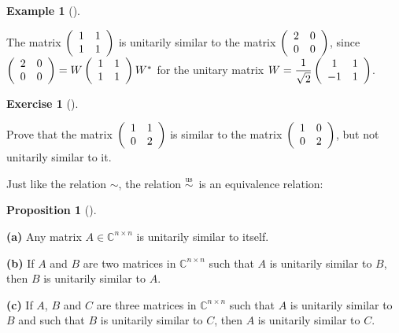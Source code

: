 \documentclass[numbers=enddot,12pt,final,onecolumn,notitlepage]{scrartcl}%
\newcounter{exer}
\numberwithin{exer}{subsection}
\theoremstyle{definition}
\newtheorem{prop}[theo]{Proposition}
\newenvironment{proposition}[1][]
{\begin{prop}[#1]\begin{leftbar}}
{\end{leftbar}\end{prop}}
\newtheorem{exam}[theo]{Example}
\newenvironment{example}[1][]
{\begin{exam}[#1]\begin{leftbar}}
{\end{leftbar}\end{exam}}
\newtheorem{exmp}[exer]{Exercise}
\newenvironment{exercise}[1][]
{\begin{exmp}[#1]\begin{leftbar}}
{\end{leftbar}\end{exmp}}
\begin{document}
\begin{example}
The matrix $\left(
\begin{array}
[c]{cc}%
1 & 1\\
1 & 1
\end{array}
\right)  $ is unitarily similar to the matrix $\left(
\begin{array}
[c]{cc}%
2 & 0\\
0 & 0
\end{array}
\right)  $, since $\left(
\begin{array}
[c]{cc}%
2 & 0\\
0 & 0
\end{array}
\right)  =W\left(
\begin{array}
[c]{cc}%
1 & 1\\
1 & 1
\end{array}
\right)  W^{\ast}$ for the unitary matrix $W=\dfrac{1}{\sqrt{2}}\left(
\begin{array}
[c]{cc}%
1 & 1\\
-1 & 1
\end{array}
\right)  $.
\end{example}

\begin{exercise}
\label{exe.schurtri.unisim.two2x2} Prove that the matrix $\left(
\begin{array}
[c]{cc}%
1 & 1\\
0 & 2
\end{array}
\right)  $ is similar to the matrix $\left(
\begin{array}
[c]{cc}%
1 & 0\\
0 & 2
\end{array}
\right)  $, but not unitarily similar to it.
\end{exercise}

Just like the relation $\sim$, the relation $\overset{\operatorname*{us}%
}{\sim}$\ is an equivalence relation:

\begin{proposition}
\label{prop.schurtri.unisim.eqrel}\textbf{(a)} Any matrix $A\in\mathbb{C}%
^{n\times n}$ is unitarily similar to itself. \medskip

\textbf{(b)} If $A$ and $B$ are two matrices in $\mathbb{C}^{n\times n}$ such
that $A$ is unitarily similar to $B$, then $B$ is unitarily similar to $A$.
\medskip

\textbf{(c)} If $A$, $B$ and $C$ are three matrices in $\mathbb{C}^{n\times
n}$ such that $A$ is unitarily similar to $B$ and such that $B$ is unitarily
similar to $C$, then $A$ is unitarily similar to $C$.
\end{proposition}
\end{document}
